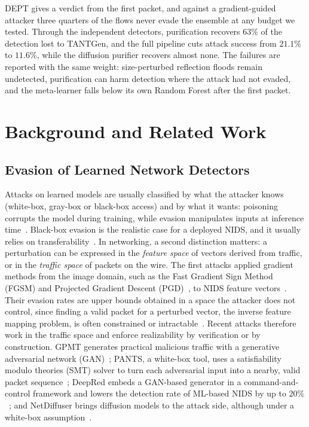 \documentclass[acmtog,nonacm,pbalance]{acmart}
\begin{document}
DEPT gives a verdict from the first packet, and against a gradient-guided
attacker three quarters of the flows never evade the ensemble at any budget we
tested. Through the independent detectors, purification recovers $63\%$ of the
detection lost to TANTGen, and the full pipeline cuts attack success from
$21.1\%$ to $11.6\%$, while the diffusion purifier recovers almost none. The
failures are reported with the same weight: size-perturbed reflection floods
remain undetected, purification can harm detection where the attack had not
evaded, and the meta-learner falls below its own Random Forest after the first
packet.

\section{Background and Related Work}\label{sec:related}

\subsection{Evasion of Learned Network Detectors}

Attacks on learned models are usually classified by what the attacker knows
(white-box, gray-box or black-box access) and by what it wants: poisoning
corrupts the model during training, while evasion manipulates inputs at
inference time~\cite{he2023adversarial}. Black-box evasion is the realistic case
for a deployed NIDS, and it usually relies on
transferability~\cite{papernot2017practical}. In networking, a second
distinction matters: a perturbation can be expressed in the \emph{feature
space} of vectors derived from traffic, or in the \emph{traffic space} of
packets on the wire. The first attacks applied gradient methods from the image
domain, such as the Fast Gradient Sign Method (FGSM) and Projected Gradient
Descent (PGD)~\cite{goodfellow2014explaining,madry2018towards},
to NIDS feature vectors~\cite{hashemi2019towards,zhang2020tiki}. Their evasion
rates are upper bounds obtained in a space the attacker does not control, since
finding a valid packet for a perturbed vector, the inverse feature mapping
problem, is often constrained or intractable~\cite{pierazzi2020intriguing}.
Recent attacks therefore work in the traffic space and enforce realizability by
verification or by construction. GPMT generates practical malicious traffic
with a generative adversarial network (GAN)~\cite{sun2023gpmt}; PANTS, a
white-box tool, uses a satisfiability modulo theories (SMT) solver to turn each
adversarial input into a nearby, valid packet sequence~\cite{jin2025robustifying}; DeepRed
embeds a GAN-based generator in a command-and-control framework and lowers the
detection rate of ML-based NIDS by up to
$20\%$~\cite{hajizadeh2025deepred}; and NetDiffuser brings diffusion models to
the attack side, although under a white-box
assumption~\cite{kumar2026netdiffuser}.
\end{document}
